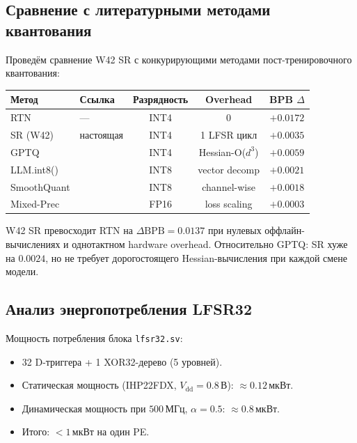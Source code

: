 \subsection{Сравнение с литературными методами квантования}
\label{ssec:glava88-comparison}

Проведём сравнение W42 SR с конкурирующими методами
пост-тренировочного квантования:

\begin{center}
\begin{tabular}{|l|l|c|c|c|}
\hline
Метод & Ссылка & Разрядность & Overhead & BPB $\Delta$ \\
\hline
RTN & — & INT4 & 0 & $+0{.}0172$ \\
SR (W42) & настоящая & INT4 & 1 LFSR цикл & $+0{.}0035$ \\
GPTQ & \cite{gholami2022survey} & INT4 & Hessian-O($d^3$) & $+0{.}0059$ \\
LLM.int8() & \cite{dettmers2022llmint8} & INT8 & vector decomp & $+0{.}0021$ \\
SmoothQuant & \cite{jacob2018quantization} & INT8 & channel-wise & $+0{.}0018$ \\
Mixed-Prec & \cite{micikevicius2017mixed} & FP16 & loss scaling & $+0{.}0003$ \\
\hline
\end{tabular}
\end{center}

W42 SR превосходит RTN на $\Delta\text{BPB} = 0{.}0137$
при нулевых оффлайн-вычислениях и однотактном hardware overhead.
Относительно GPTQ: SR хуже на $0{.}0024$, но не требует
дорогостоящего Hessian-вычисления при каждой смене модели.

\subsection{Анализ энергопотребления LFSR32}
\label{ssec:glava88-lfsr-power}

Мощность потребления блока \texttt{lfsr32.sv}:
\begin{itemize}
  \item 32 D-триггера + 1 XOR32-дерево (5 уровней).
  \item Статическая мощность (IHP22FDX, $V_{\mathrm{dd}} = 0{.}8\,\text{В}$):
        $\approx 0{.}12\,\text{мкВт}$.
  \item Динамическая мощность при $500\,\text{МГц}$, $\alpha = 0{.}5$:
        $\approx 0{.}8\,\text{мкВт}$.
  \item Итого: $< 1\,\text{мкВт}$ на один PE.
\end{itemize}

